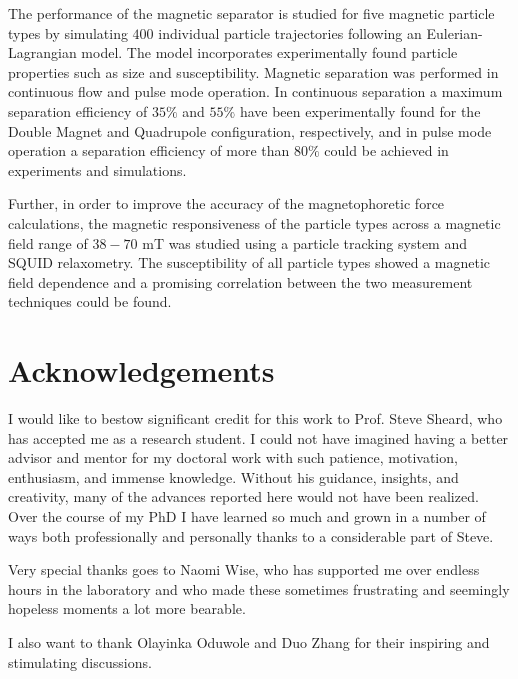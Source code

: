 The performance of the magnetic separator is studied for five magnetic particle types by simulating $400$ individual particle trajectories following an Eulerian-Lagrangian model. The model incorporates experimentally found particle properties such as size and susceptibility. Magnetic separation was performed in continuous flow and pulse mode operation. In continuous separation a maximum separation efficiency of $35\%$ and $55\%$ have been experimentally found for the Double Magnet and Quadrupole configuration, respectively, and in pulse mode operation a separation efficiency of more than $80\%$ could be achieved in experiments and simulations.

Further, in order to improve the accuracy of the magnetophoretic force calculations, the magnetic responsiveness of the particle types across a magnetic field range of $38-70$ mT was studied using a particle tracking system and SQUID relaxometry. The susceptibility of all particle types showed a magnetic field dependence and a promising correlation between the two measurement techniques could be found.



 \cleardoublepage
 

\chapter*{Acknowledgements}

I would like to bestow significant credit for this work to Prof. Steve Sheard, who has accepted me as a research student. I could not have imagined having a better advisor and mentor for my doctoral work with such patience, motivation, enthusiasm, and immense knowledge. Without his guidance, insights, and creativity, many of the advances reported here would not have been realized. Over the course of my PhD I have learned so much and grown in a number of ways both professionally and personally thanks to a considerable part of Steve.

Very special thanks goes to Naomi Wise, who has supported me over endless hours in the laboratory and who made these sometimes frustrating and seemingly hopeless moments a lot more bearable.

I also want to thank Olayinka Oduwole and Duo Zhang for their inspiring and stimulating discussions. 

